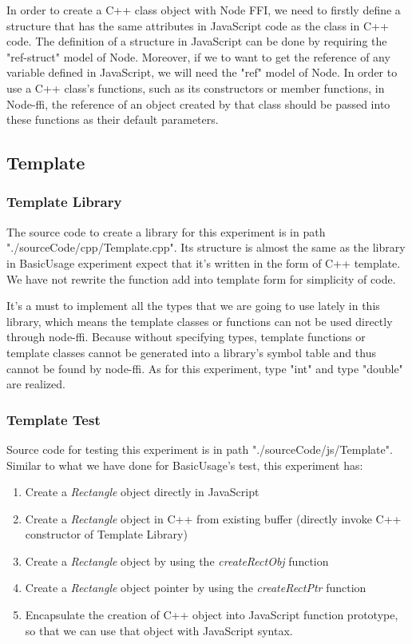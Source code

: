     In order to create a C++ class object with Node FFI, we need to firstly define a structure that has the same attributes in JavaScript code as the class in C++ code. The definition of a structure in JavaScript can be done by requiring the "ref-struct" model of Node. Moreover, if we to want to get the reference of any variable defined in JavaScript, we will need the "ref" model of Node.\newline
    In order to use a C++ class's functions, such as its constructors or member functions, in Node-ffi, the reference of an object created by that class should be passed into these functions as their default parameters.

\subsection{Template}       
\subsubsection{Template Library}     
The source code to create a library for this experiment is in path "./sourceCode/cpp/Template.cpp". Its structure is almost the same as the library in BasicUsage experiment expect that it's written in the form of C++ template. We have not rewrite the function add into template form for simplicity of code.

It's a must to implement all the types that we are going to use lately in this library, which means the template classes or functions can not be used directly through node-ffi. Because without specifying types, template functions or template classes cannot be generated into a library's symbol table and thus cannot be found by node-ffi. As for this experiment, type "int" and type "double" are realized.

\subsubsection{Template Test}    
     Source code for testing this experiment is in path "./sourceCode/js/Template". Similar to what we have done for BasicUsage's test, this experiment has:
     
        \begin{enumerate}
            \item Create a \textit{Rectangle} object directly in JavaScript
            \item Create a \textit{Rectangle} object in C++ from existing buffer (directly invoke C++ constructor of Template Library)
            \item Create a \textit{Rectangle} object by using the \textit{createRectObj} function
            \item 
Create a \textit{Rectangle} object pointer by using the \textit{createRectPtr} function
            \item
Encapsulate the creation of C++ object into JavaScript function prototype, so that we can use that object with JavaScript syntax.
        \end{enumerate}
     
